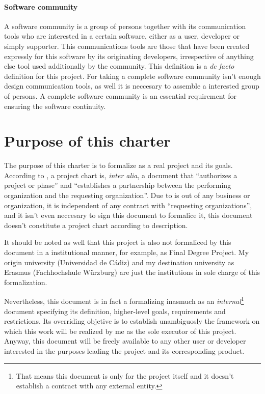 \documentclass[twocolumn]{article}
\begin{document}
\paragraph{Software community}
A software community is a group of persons together
with its communication tools who are interested in a certain software,
either as a user, developer or simply supporter. This communications
tools are those that have been created expressly for this software by
its originating developers, irrespective of anything else tool used
additionally by the community. This definition is a \textit{de facto}
definition for this project. For taking a complete software community
isn't enough design communication tools, as well it is neccesary to
assemble a interested group of persons. A complete software community
is an essential requirement for ensuring the software continuity.

\section{Purpose of this charter}
\label{sec:purpose}
The purpose of this charter is to formalize \favp as a real
project and its goals. According to \pmbok, a project chart is,
\textit{inter alia}, a document that
``authorizes a project or phase'' and ``establishes a
partnership between the performing organization and the requesting
organization''. Due to \favp is out of any business
or organization, it is independent of any contract with ``requesting
organizations'', and it isn't even neccesary to sign this document to
formalice it, this document doesn't constitute a project chart
according to \pmbok description.

It should be noted as well that this project is also not formaliced by
this document in a institutional manner, for example, as Final Degree
Project. My origin university (Universidad de Cádiz) and my
destination university as Erasmus (Fachhochshule Würzburg) are just
the institutions in sole charge of this formalization.

Nevertheless, this document is in fact a \chart formalizing \favp
inasmuch as an \textit{internal}\footnote{That means this document is
  only for the project itself and it doesn't establish a contract with
  any external entity.} document specifying its definition,
higher-level goals, requirements and restrictions. Its overriding
objetive is to establish unambiguosly the framework on which this work
will be realized by me as the sole executor of this project. Anyway,
this document will be freely available to any other user or developer
interested in the purposes leading the project and its corresponding
product.
\end{document}
